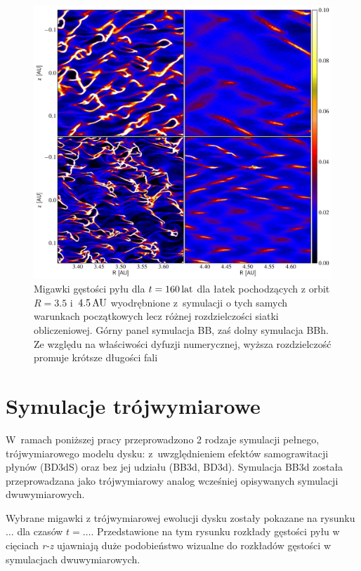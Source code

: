 \begin{figure}
   \includegraphics[width=0.98\linewidth]{figures/fig10}
   \caption{Migawki gęstości pyłu dla $t = 160\hbox{$\thinspace\textrm{lat}$}$ dla łatek pochodzących z
      orbit $R=3.5$ i~$4.5\hbox{$\thinspace\textrm{AU}$}$ wyodrębnione z~symulacji o tych samych warunkach
      początkowych lecz różnej rozdzielczości siatki obliczeniowej. Górny panel
      symulacja BB, zaś dolny symulacja BBh. Ze względu na właściwości
      dyfuzji numerycznej, wyższa rozdzielczość promuje krótsze długości
      fali}
   \label{fig10} 
\end{figure}

\section{Symulacje trójwymiarowe}
W~ramach poniższej pracy przeprowadzono 2 rodzaje symulacji pełnego,
trójwymiarowego modelu dysku: z~uwzględnieniem efektów samograwitacji płynów
(BD3dS) oraz bez jej udziału (BB3d, BD3d). Symulacja BB3d została przeprowadzana
jako trójwymiarowy analog wcześniej opisywanych symulacji dwuwymiarowych.

Wybrane migawki z trójwymiarowej ewolucji dysku zostały pokazane na rysunku
$\ldots$ dla czasów $t = \ldots$. Przedstawione na tym rysunku rozkłady gęstości
pyłu w cięciach \textit{r-z} ujawniają duże podobieństwo wizualne do rozkładów gęstości
w symulacjach dwuwymiarowych. 

